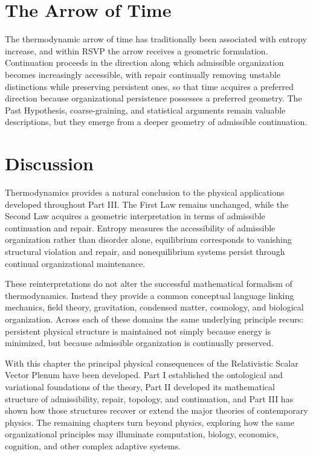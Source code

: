 \documentclass[11pt,oneside]{book}
\numberwithin{equation}{chapter}
\theoremstyle{definition}
\theoremstyle{plain}
\begin{document}
\section{The Arrow of Time}

The thermodynamic arrow of time has traditionally been associated with entropy increase, and within RSVP the arrow receives a geometric formulation. Continuation proceeds in the direction along which admissible organization becomes increasingly accessible, with repair continually removing unstable distinctions while preserving persistent ones, so that time acquires a preferred direction because organizational persistence possesses a preferred geometry. The Past Hypothesis, coarse-graining, and statistical arguments remain valuable descriptions, but they emerge from a deeper geometry of admissible continuation.

\section{Discussion}

Thermodynamics provides a natural conclusion to the physical applications
developed throughout Part III. The First Law remains unchanged, while the
Second Law acquires a geometric interpretation in terms of admissible
continuation and repair. Entropy measures the accessibility of admissible
organization rather than disorder alone, equilibrium corresponds to
vanishing structural violation and repair, and nonequilibrium systems
persist through continual organizational maintenance.

These reinterpretations do not alter the successful mathematical formalism
of thermodynamics. Instead they provide a common conceptual language linking
mechanics, field theory, gravitation, condensed matter, cosmology, and
biological organization. Across each of these domains the same underlying
principle recurs: persistent physical structure is maintained not simply
because energy is minimized, but because admissible organization is
continually preserved.

With this chapter the principal physical consequences of the Relativistic
Scalar Vector Plenum have been developed. Part I established the
ontological and variational foundations of the theory, Part II developed
its mathematical structure of admissibility, repair, topology, and
continuation, and Part III has shown how those structures recover or extend
the major theories of contemporary physics. The remaining chapters turn
beyond physics, exploring how the same organizational principles may
illuminate computation, biology, economics, cognition, and other complex
adaptive systems.
\end{document}
